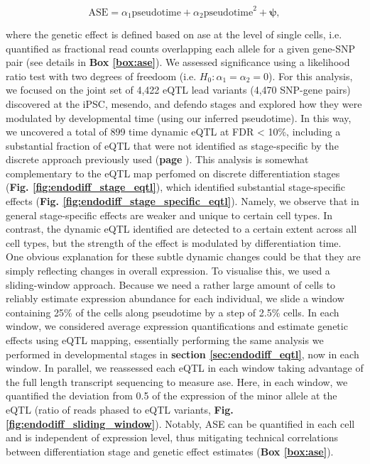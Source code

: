 \begin{equation}\label{eq:endodiff_ase_pseudotime}
    \mathrm{ASE} = \alpha_1 \mathrm{pseudotime} + \alpha_2 \mathrm{pseudotime}^2 + \boldsymbol{\psi},
\end{equation}

where the genetic effect is defined based on \gls{ase} at the level of single cells, i.e. quantified as fractional read counts overlapping each allele for a given gene-SNP pair (see details in \textbf{Box \ref{box:ase}}).
We assessed significance using a likelihood ratio test with two degrees of freedoom (i.e. $H_0: \alpha_1 = \alpha_2 = 0$). 
For this analysis, we focused on the joint set of 4,422 eQTL lead variants (4,470 SNP-gene pairs) discovered at the iPSC, mesendo, and defendo stages and explored how they were modulated by developmental time (using our inferred pseudotime).
In this way, we uncovered a total of 899 time dynamic eQTL at FDR < 10\%, including a substantial fraction of eQTL that were not identified as stage-specific by the discrete approach previously used (\textbf{page \pageref{fig:endodiff_stage_specific_eqtl}}).
This analysis is somewhat complementary to the eQTL map perfomed on discrete differentiation stages (\textbf{Fig. \ref{fig:endodiff_stage_eqtl}}), which identified substantial stage-specific effects (\textbf{Fig. \ref{fig:endodiff_stage_specific_eqtl}}).
Namely, we observe that in general stage-specific effects are weaker and unique to certain cell types.
In contrast, the dynamic eQTL identified are detected to a certain extent across all cell types, but the strength of the effect is modulated by differentiation time. \\

One obvious explanation for these subtle dynamic changes could be that they are simply reflecting changes in overall expression. 
To visualise this, we used a sliding-window approach. 
Because we need a rather large amount of cells to reliably estimate expression abundance for each individual, we slide a window containing 25\% of the cells along pseudotime by a step of 2.5\% cells.
In each window, we considered average expression quantifications and estimate genetic effects using eQTL mapping, essentially performing the same analysis we performed in developmental stages in \textbf{section \ref{sec:endodiff_eqtl}}, now in each window.
In parallel, we reassessed each eQTL in each window taking advantage of the full length transcript sequencing to measure \gls{ase}.
Here, in each window, we quantified the deviation from 0.5 of the expression of the minor allele at the eQTL (ratio of reads phased to eQTL variants, \textbf{Fig. \ref{fig:endodiff_sliding_window}}). 
Notably, ASE can be quantified in each cell and is independent of expression level, thus mitigating technical correlations between differentiation stage and genetic effect estimates (\textbf{Box \ref{box:ase}}). 

